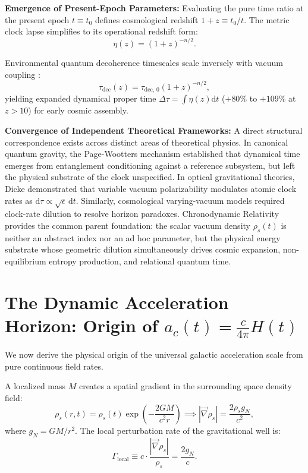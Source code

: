 \documentclass[aps,prd,reprint,superscriptaddress,nofootinbib,floatfix,amsmath,amssymb]{revtex4-2}
\begin{document}
\textbf{Emergence of Present-Epoch Parameters:} Evaluating the pure time ratio at the present epoch $t \equiv t_0$ defines cosmological redshift $1+z \equiv t_0 / t$. The metric clock lapse simplifies to its operational redshift form:
\begin{equation}
\eta(z) = (1+z)^{-n/2}.
\label{eq:eta_z_scaling}
\end{equation}

Environmental quantum decoherence timescales scale inversely with vacuum coupling \cite{Zurek2003,Gambini2004}:
\begin{equation}
\tau_{\text{dec}}(z) = \tau_{\text{dec, 0}} (1+z)^{-n/2},
\label{eq:decoherence_scaling}
\end{equation}
yielding expanded dynamical proper time $\Delta \tau = \int \eta(z) \mathrm{d}t$ ($+80\%$ to $+109\%$ at $z > 10$) for early cosmic assembly.

\textbf{Convergence of Independent Theoretical Frameworks:} A direct structural correspondence exists across distinct areas of theoretical physics. In canonical quantum gravity, the Page-Wootters mechanism \cite{PageWootters1983,Giovannetti2015} established that dynamical time emerges from entanglement conditioning against a reference subsystem, but left the physical substrate of the clock unspecified. In optical gravitational theories, Dicke \cite{Dicke1957} demonstrated that variable vacuum polarizability modulates atomic clock rates as $\mathrm{d}\tau \propto \sqrt{\epsilon}\,\mathrm{d}t$. Similarly, cosmological varying-vacuum models \cite{AlbrechtMagueijo1999} required clock-rate dilution to resolve horizon paradoxes. Chronodynamic Relativity provides the common parent foundation: the scalar vacuum density $\rho_s(t)$ is neither an abstract index nor an ad hoc parameter, but the physical energy substrate whose geometric dilution simultaneously drives cosmic expansion, non-equilibrium entropy production, and relational quantum time.

\section{The Dynamic Acceleration Horizon: Origin of \texorpdfstring{$a_c(t) = \frac{c}{4\pi} H(t)$}{ac(t) = (c/4pi) H(t)}}
\label{sec:a0_origin}

We now derive the physical origin of the universal galactic acceleration scale from pure continuous field rates.

A localized mass $M$ creates a spatial gradient in the surrounding space density field:
\begin{equation}
\rho_s(r, t) = \rho_s(t) \exp\left( -\frac{2GM}{c^2 r} \right) \implies |\vec{\nabla} \rho_s| = \frac{2 \rho_s g_N}{c^2},
\label{eq:schwarzschild_rho}
\end{equation}
where $g_N = GM/r^2$. The local perturbation rate of the gravitational well is:
\begin{equation}
\Gamma_{\text{local}} \equiv c \cdot \frac{|\vec{\nabla} \rho_s|}{\rho_s} = \frac{2 g_N}{c}.
\label{eq:local_rate}
\end{equation}
\end{document}
